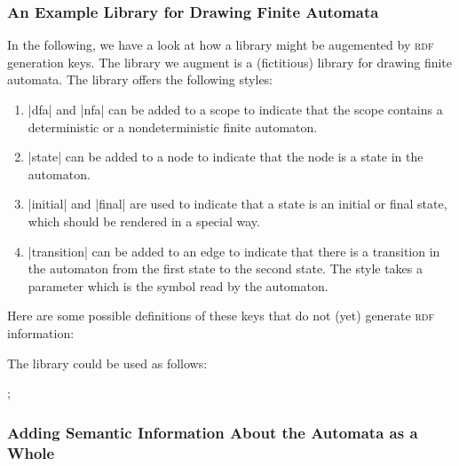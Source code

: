 \subsubsection{An Example Library for Drawing Finite Automata}

In the following, we have a look at how a library might be augemented
by \textsc{rdf} generation keys. The library we augment is a
(fictitious) library for drawing finite automata. The library offers
the following styles:
\begin{enumerate}
\item |dfa| and |nfa| can be added to a scope to indicate that the
  scope contains a deterministic or a nondeterministic finite
  automaton.
\item |state| can be added to a node to indicate that the node is a
  state in the automaton.
\item |initial| and |final| are used to indicate that a state is an
  initial or final state,   which should be rendered in a special way.
\item |transition| can be added to an edge to indicate that there is
  a transition in the automaton from the first state to the second
  state. The style takes a parameter which is the symbol read by the
  automaton. 
\end{enumerate}

Here are some possible definitions of these keys that do not (yet)
generate \textsc{rdf} information:

\begin{codeexample}
\end{codeexample}

The library could be used as follows:

\begin{codeexample}[width=5cm]
\tikz [dfa]
  ;
\end{codeexample}



\subsubsection{Adding Semantic Information About the Automata as a Whole}

